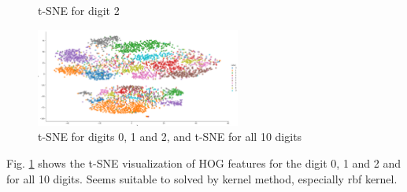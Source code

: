 \documentclass{article}
\begin{document}
\begin{figure}[H]
\begin{minipage}{0.32\textwidth}
        t-SNE for digit 2
    \end{minipage}
    \includegraphics[width=0.6\textwidth]{fig/pca/tsne.png}
    \caption{t-SNE for digits 0, 1 and 2, and t-SNE for all 10 digits}
    \label{tsne012}
\end{figure}
Fig. \ref{tsne012} shows the t-SNE visualization of HOG features for the digit 0, 1 and 2 and for all 10 digits. Seems suitable to solved by kernel method, especially rbf kernel.
\end{document}
